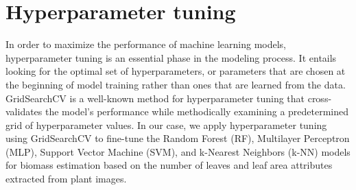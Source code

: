 \documentclass[a4paper,12pt]{report}%
\renewcommand{\\}{\vspace*{0.5\baselineskip} \newline}
\begin{document}
\section{Hyperparameter tuning}
In order to maximize the performance of machine learning models, hyperparameter tuning is an essential phase in the modeling process. It entails looking for the optimal set of hyperparameters, or parameters that are chosen at the beginning of model training rather than ones that are learned from the data. GridSearchCV is a well-known method for hyperparameter tuning that cross-validates the model's performance while methodically examining a predetermined grid of hyperparameter values.
In our case, we apply hyperparameter tuning using GridSearchCV to fine-tune the Random Forest (RF), Multilayer Perceptron (MLP), Support Vector Machine (SVM), and k-Nearest Neighbors (k-NN) models for biomass estimation based on the number of leaves and leaf area attributes extracted from plant images.
\end{document}
